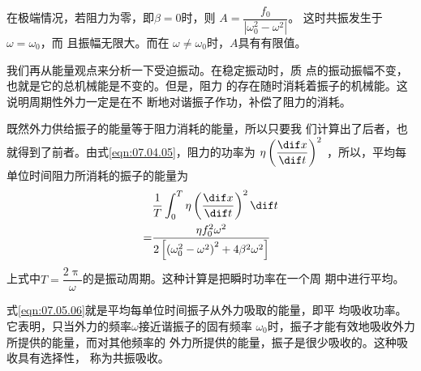 \documentclass[../outline-of-mechanics.tex]{subfiles}
\begin{document}
在极端情况，若阻力为零，即$ \beta = 0 $时，则
$ A = \dfrac { f _ { 0 } } { \left| \omega_{ 0 } ^ { 2 } - \omega ^ { 2 } \right| } $。
这时共振发生于$ \omega = \omega _ { 0 } $，而
且振幅无限大。而在
$ \omega \ne \omega _ { 0 } $时，$ A $具有有限值。

我们再从能量观点来分析一下受迫振动。在稳定振动时，质
点的振动振幅不变，也就是它的总机械能是不变的。但是，阻力
的存在随时消耗着振子的机械能。这说明周期性外力一定是在不
断地对谐振子作功，补偿了阻力的消耗。

既然外力供给振子的能量等于阻力消耗的能量，所以只要我
们计算出了后者，也就得到了前者。由式\eqref{eqn:07.04.05}，阻力的功率为
$ \eta \left( \dfrac { \dif x } { \dif t } \right) ^ { 2 } $
，所以，平均每单位时间阻力所消耗的振子的能量为
\begin{equation}\label{eqn:07.05.06}
  \begin{aligned}
      & \frac { 1 } { T } \int _ { 0 } ^ { T } \eta \left( \frac { \dif x } { \dif t } \right) ^ { 2 } \dif t                                                              \\
    = & \frac { \eta f _ { 0 } ^ { 2 } \omega ^ { 2 } } { 2 \left[ \left( \omega_{ 0 } ^ { 2 } - \omega ^ { 2 } \right) ^ { 2 } + 4 \beta ^ { 2 } \omega ^ { 2 } \right] }
  \end{aligned}
\end{equation}
上式中$ T = \dfrac { 2 \uppi } { \omega } $的是振动周期。这种计算是把瞬时功率在一个周
期中进行平均。

式\eqref{eqn:07.05.06}就是平均每单位时间振子从外力吸取的能量，即平
均吸收功率。它表明，只当外力的频率$ \omega $接近谐振子的固有频率
$ \omega_{ 0 } $时，振子才能有效地吸收外力所提供的能量，而对其他频率的
外力所提供的能量，振子是很少吸收的。这种吸收具有选择性，
称为共振吸收。
\end{document}
